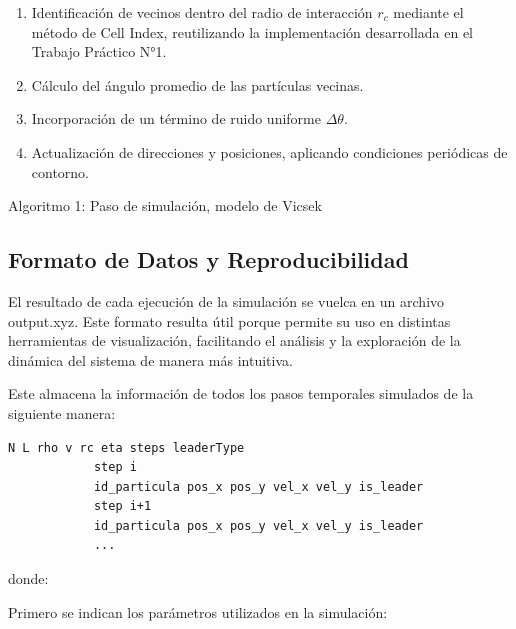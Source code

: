 \documentclass[a4paper,12pt]{article}
\begin{document}
\begin{center}
	\begin{tcolorbox}[width=0.9\textwidth, colback=white, colframe=black, boxrule=0.6pt]
		\begin{enumerate}
			\item Identificación de vecinos dentro del radio de interacción $r_c$ mediante el método de Cell Index, reutilizando la implementación desarrollada en el Trabajo Práctico N°1.
			\item Cálculo del ángulo promedio de las partículas vecinas.
			\item Incorporación de un término de ruido uniforme $\Delta \theta$.
			\item Actualización de direcciones y posiciones, aplicando condiciones periódicas de contorno.
		\end{enumerate}
	\end{tcolorbox}
	\small{Algoritmo 1: Paso de simulación, modelo de Vicsek}
\end{center}

\subsection{Formato de Datos y Reproducibilidad}

El resultado de cada ejecución de la simulación se vuelca en un archivo output.xyz. Este formato resulta útil porque permite su uso en distintas herramientas de visualización, facilitando el análisis y la exploración de la dinámica del sistema de manera más intuitiva.

Este almacena la información de todos los pasos temporales simulados de la siguiente manera:

\begin{center}
	\begin{tcolorbox}[width=0.8\textwidth, colback=white, colframe=black, boxrule=0.6pt]
		\begin{Verbatim}[gobble=3]
			N L rho v rc eta steps leaderType
			step i
			id_particula pos_x pos_y vel_x vel_y is_leader
			step i+1
			id_particula pos_x pos_y vel_x vel_y is_leader
			...
		\end{Verbatim}
	\end{tcolorbox}
\end{center}

donde:

Primero se indican los parámetros utilizados en la simulación:
\end{document}

